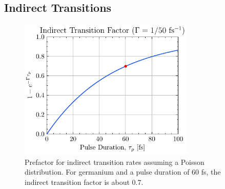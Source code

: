 
\subsection{Indirect Transitions}
\label{sec:indirect_transitions}

\begin{figure}
	\centering
	\includegraphics[width=0.75\textwidth]{figures/chap4/Indirect_transition_factor.pdf}
	\caption{Prefactor for indirect transition rates assuming a Poisson distribution. For germanium and a pulse duration of 60 fs, the indirect transition factor is about 0.7.}
	\label{fig:Indirect_transition_factor}
\end{figure}

